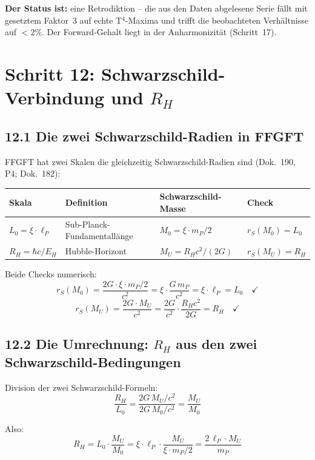 \textbf{Der Status ist:} eine Retrodiktion -- die aus den Daten
abgelesene Serie fällt mit gesetztem Faktor~3 auf echte T$^4$-Maxima und
trifft die beobachteten Verhältnisse auf $< 2\%$. Der Forward-Gehalt liegt
in der Anharmonizität (Schritt~17).

\section{Schritt 12: Schwarzschild-Verbindung und $R_H$}

\subsection*{12.1 Die zwei Schwarzschild-Radien in FFGFT}

FFGFT hat zwei Skalen die gleichzeitig Schwarzschild-Radien sind
(Dok.~190, P4; Dok.~182):

\begin{center}
\begin{tabular}{p{2.5cm}p{4cm}p{4cm}l}
\toprule
\textbf{Skala} & \textbf{Definition} & \textbf{Schwarzschild-Masse} & \textbf{Check} \\
\midrule
$L_0 = \xi\cdot\ell_P$ &
  Sub-Planck-Fundamentallänge &
  $M_0 = \xi\cdot m_P/2$ &
  $r_S(M_0) = L_0$ \\
\addlinespace
$R_H = \hbar c/E_H$ &
  Hubble-Horizont &
  $M_U = R_H c^2/(2G)$ &
  $r_S(M_U) = R_H$ \\
\bottomrule
\end{tabular}
\end{center}

Beide Checks numerisch:
\[
  r_S(M_0) = \frac{2G\cdot\xi\cdot m_P/2}{c^2}
  = \xi\cdot\frac{G\,m_P}{c^2}
  = \xi\cdot\ell_P = L_0
  \quad\checkmark
\]
\[
  r_S(M_U) = \frac{2G\cdot M_U}{c^2}
  = \frac{2G}{c^2}\cdot\frac{R_H c^2}{2G}
  = R_H
  \quad\checkmark
\]

\subsection*{12.2 Die Umrechnung: $R_H$ aus den zwei Schwarzschild-Bedingungen}

Division der zwei Schwarzschild-Formeln:
\[
  \frac{R_H}{L_0}
  = \frac{2G\,M_U/c^2}{2G\,M_0/c^2}
  = \frac{M_U}{M_0}
\]

Also:
\[
  \boxed{R_H = L_0 \cdot \frac{M_U}{M_0}
  = \xi\cdot\ell_P\cdot\frac{M_U}{\xi\cdot m_P/2}
  = \frac{2\,\ell_P\cdot M_U}{m_P}}
\]

